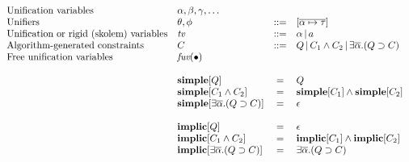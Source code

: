 \documentclass{article}
\newcommand{\hasgrammar}{::=}
\newcommand{\orprod}{\, | \,}
\newcommand{\multi}[1]{{\overline{#1}}}
\newcommand{\Q}{\mathcal{Q}}
\newcommand{\arrowish}{|\!\!\!\rightarrow}
\newcommand{\rulen}[1]{\textsc{#1}}
\begin{document}
\[
\begin{array}{llcl}

\text{Unification variables}                   & \alpha, \beta, \gamma, \ldots \\
\text{Unifiers}                                & \theta, \phi                  & \hasgrammar & [\multi{\alpha \mapsto \tau}] \\
\text{Unification or rigid (skolem) variables} & \textit{tv}                   & \hasgrammar & \alpha \orprod a \\
\text{Algorithm-generated constraints}         & C                             & \hasgrammar & Q \orprod C_1 \land C_2 \orprod \exists \multi{\alpha}. (Q \supset C) \\
\text{Free unification variables}              & \textit{fuv}(\bullet) \\

\\
& \simple{Q}                                     & = & Q \\
& \simple{C_1 \land C_2}                         & = & \simple{C_1} \land \simple{C_2} \\
& \simple{\exists \multi{\alpha}. (Q \supset C)} & = & \epsilon \\

\\
& \implic{Q}                                     & = & \epsilon \\
& \implic{C_1 \land C_2}                         & = & \implic{C_1} \land \implic{C_2} \\
& \implic{\exists \multi{\alpha}. (Q \supset C)} & = & \exists \multi{\alpha}. (Q \supset C) \\

\end{array}
\]



\end{document}
